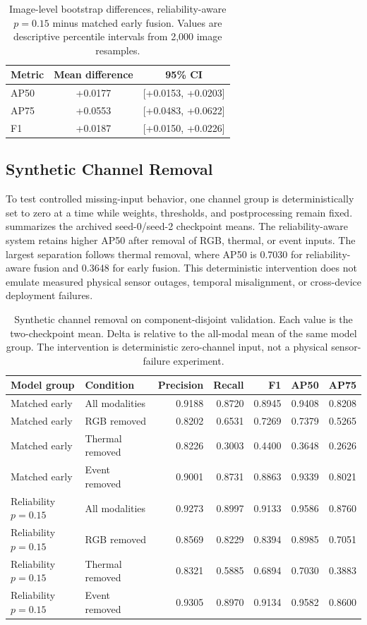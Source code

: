 \begin{table}[t]
\centering
\caption{Image-level bootstrap differences, reliability-aware $p=0.15$ minus matched early fusion. Values are descriptive percentile intervals from 2,000 image resamples.}
\label{tab:bootstrap}
\scriptsize
\begin{tabular}{@{}lcc@{}}
\toprule
Metric & Mean difference & 95\% CI\\
\midrule
AP50 & +0.0177 & [+0.0153, +0.0203]\\
AP75 & +0.0553 & [+0.0483, +0.0622]\\
F1 & +0.0187 & [+0.0150, +0.0226]\\
\bottomrule
\end{tabular}
\end{table}

\subsection{Synthetic Channel Removal}
To test controlled missing-input behavior, one channel group is deterministically set to zero at a time while weights, thresholds, and postprocessing remain fixed.  summarizes the archived seed-0/seed-2 checkpoint means. The reliability-aware system retains higher AP50 after removal of RGB, thermal, or event inputs. The largest separation follows thermal removal, where AP50 is 0.7030 for reliability-aware fusion and 0.3648 for early fusion. This deterministic intervention does not emulate measured physical sensor outages, temporal misalignment, or cross-device deployment failures.

\begin{table}[t]
\centering
\caption{Synthetic channel removal on component-disjoint validation. Each value is the two-checkpoint mean. Delta is relative to the all-modal mean of the same model group. The intervention is deterministic zero-channel input, not a physical sensor-failure experiment.}
\label{tab:removal}
\scriptsize
\begin{tabular}{@{}llrrrrr@{}}
\toprule
Model group & Condition & Precision & Recall & F1 & AP50 & AP75\\
\midrule
Matched early & All modalities & 0.9188 & 0.8720 & 0.8945 & 0.9408 & 0.8208\\
Matched early & RGB removed & 0.8202 & 0.6531 & 0.7269 & 0.7379 & 0.5265\\
Matched early & Thermal removed & 0.8226 & 0.3003 & 0.4400 & 0.3648 & 0.2626\\
Matched early & Event removed & 0.9001 & 0.8731 & 0.8863 & 0.9339 & 0.8021\\
\midrule
Reliability $p=0.15$ & All modalities & 0.9273 & 0.8997 & 0.9133 & 0.9586 & 0.8760\\
Reliability $p=0.15$ & RGB removed & 0.8569 & 0.8229 & 0.8394 & 0.8985 & 0.7051\\
Reliability $p=0.15$ & Thermal removed & 0.8321 & 0.5885 & 0.6894 & 0.7030 & 0.3883\\
Reliability $p=0.15$ & Event removed & 0.9305 & 0.8970 & 0.9134 & 0.9582 & 0.8600\\
\bottomrule
\end{tabular}
\end{table}

